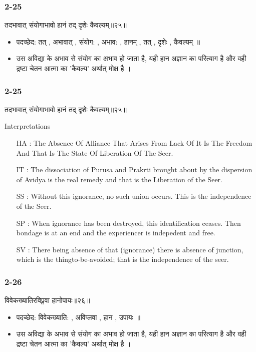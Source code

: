 \begin{frame}[fragile]\frametitle{2-25}
\begin{sanskrit}
तदभावात् संयोगाभावो हानं तद् दृशेः कैवल्यम्॥२५॥
\end{sanskrit}

\begin{itemize}
\item पदच्छेद: तत् , अभावात् , संयोग: , अभाव: , हानम् , तत् , दृशेः , कैवल्यम् ॥
\item उस अविद्या के अभाव से संयोग का अभाव हो जाता है, यही हान अज्ञान का परित्याग है और वही द्रष्टा चेतन आत्मा का 'कैवल्य' अर्थात् मोक्ष है ।
\end{itemize}
	
\end{frame}


\begin{frame}[fragile]\frametitle{2-25}
\begin{sanskrit}
तदभावात् संयोगाभावो हानं तद् दृशेः कैवल्यम्॥२५॥
\end{sanskrit}

Interpretations
\begin{itemize}
\item [HA]: The Absence Of Alliance That Arises From Lack Of It Is The Freedom And That Is The State Of Liberation Of The Seer.
\item [IT]: The dissociation of Purusa and Prakrti brought about by the dispersion of Avidya is the real remedy and that is the Liberation of the Seer.
\item [SS]: Without this ignorance, no such union occurs. This is the independence of the Seer.
\item [SP]: When ignorance has been destroyed, this identification ceases. Then bondage is at an end and the experiencer is indepedent and free.
\item [SV]: There being absence of that (ignorance) there is absence of junction, which is the thingto-be-avoided; that is the independence of the seer. 
\end{itemize}
	
\end{frame}

\begin{frame}[fragile]\frametitle{2-26}
\begin{sanskrit}
विवेकख्यातिरविप्लवा हानोपायः॥२६॥
\end{sanskrit}

\begin{itemize}
\item पदच्छेद: विवेकख्याति: , अविप्लवा , हान , उपायः ॥
\item उस अविद्या के अभाव से संयोग का अभाव हो जाता है, यही हान अज्ञान का परित्याग है और वही द्रष्टा चेतन आत्मा का 'कैवल्य' अर्थात् मोक्ष है ।
\end{itemize}
	
\end{frame}


